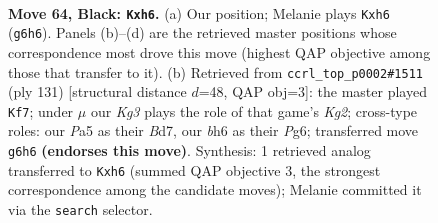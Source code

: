 \documentclass[11pt]{article}
\begin{document}
\clearpage

\begin{figure}[p]\centering
\begin{subfigure}{0.46\textwidth}\centering
\resizebox{\linewidth}{!}{%
\newchessgame
\chessboard[
  setfen={n7/3n4/1b1N2kB/p2p4/8/PP2P2p/2B1P3/4K3 b - - 0 64},
  showmover=false,
  pgfstyle=straightmove, color=movearrow, markmove={g6-h6}
]}
\caption{}
\end{subfigure}\hfill
\begin{subfigure}{0.46\textwidth}\centering
\resizebox{\linewidth}{!}{%
\newchessgame
\chessboard[
  setfen={8/3b2k1/p2P2p1/3P4/1n3P1p/1B1p1N2/5KP1/8 b - - 0 66},
  showmover=false,
  pgfstyle=straightmove, color=movearrow, markmove={g7-f7}
]}
\caption{}
\end{subfigure}
\\[4pt]

\caption{\textbf{Move 64, Black: \texttt{Kxh6}.} (a) Our position; Melanie plays \texttt{Kxh6} (\texttt{g6h6}). Panels (b)--(d) are the retrieved master positions whose correspondence most drove this move (highest QAP objective among those that transfer to it). (b) Retrieved from \texttt{ccrl\_top\_p0002\#1511} (ply 131) [structural distance $d$=48, QAP obj=3]: the master played \texttt{Kf7}; under $\mu$ our \emph{Kg3} plays the role of that game's \emph{Kg2}; cross-type roles: our \emph{P}a5 as their \emph{B}d7, our \emph{b}h6 as their \emph{P}g6; transferred move \texttt{g6h6} \textbf{(endorses this move)}. Synthesis: 1 retrieved analog transferred to \texttt{Kxh6} (summed QAP objective 3, the strongest correspondence among the candidate moves); Melanie committed it via the \texttt{search} selector.}
\label{fig:thought-m127}
\end{figure}

\clearpage
\end{document}
